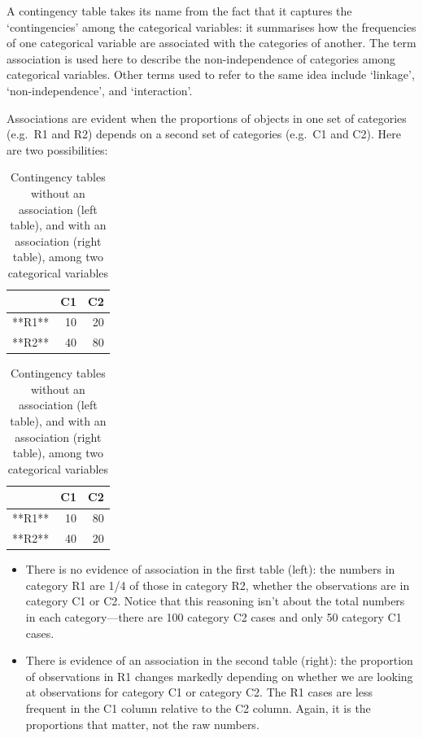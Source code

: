 \documentclass[
]{book}
\begin{document}
A contingency table takes its name from the fact that it captures the `contingencies' among the categorical variables: it summarises how the frequencies of one categorical variable are associated with the categories of another. The term association is used here to describe the non-independence of categories among categorical variables. Other terms used to refer to the same idea include `linkage', `non-independence', and `interaction'.

Associations are evident when the proportions of objects in one set of categories (e.g.~R1 and R2) depends on a second set of categories (e.g.~C1 and C2). Here are two possibilities:

\begin{table}
\caption{\label{tab:unnamed-chunk-226}Contingency tables without an association (left table), 
             and with an association (right table), among two categorical variables}

\centering
\begin{tabular}[t]{lrr}
\toprule
  & C1 & C2\\
\midrule
**R1** & 10 & 20\\
**R2** & 40 & 80\\
\bottomrule
\end{tabular}
\centering
\begin{tabular}[t]{lrr}
\toprule
  & C1 & C2\\
\midrule
**R1** & 10 & 80\\
**R2** & 40 & 20\\
\bottomrule
\end{tabular}
\end{table}

\begin{itemize}
\item
  There is no evidence of association in the first table (left): the numbers in category R1 are 1/4 of those in category R2, whether the observations are in category C1 or C2. Notice that this reasoning isn't about the total numbers in each category---there are 100 category C2 cases and only 50 category C1 cases.
\item
  There is evidence of an association in the second table (right): the proportion of observations in R1 changes markedly depending on whether we are looking at observations for category C1 or category C2. The R1 cases are less frequent in the C1 column relative to the C2 column. Again, it is the proportions that matter, not the raw numbers.
\end{itemize}
\end{document}
